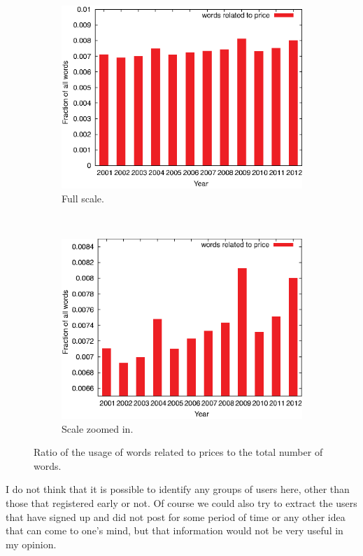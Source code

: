     \begin{figure}[H]
      \centering
      \begin{subfigure}[H]{0.65\textwidth}
        \includegraphics[width=\textwidth]{chapters/03_implementation/yearly_price1}
        \caption{Full scale.}
        \label{fig:dist_price_year_1}
      \end{subfigure}
      \\
      \begin{subfigure}[H]{0.65\textwidth}
        \includegraphics[width=\textwidth]{chapters/03_implementation/yearly_price2}
        \caption{Scale zoomed in.}
        \label{fig:dist_price_year_2}
      \end{subfigure}
      \caption{Ratio of the usage of words related to prices to the total number of words.}
      \label{fig:dist_price_year}
    \end{figure}
    I do not think that it is possible to identify any groups of users here, other than those that registered early or not. Of course we could also try to extract the users that have signed up and did not post for some period of time or any other idea that can come to one's mind, but that information would not be very useful in my opinion.
    
